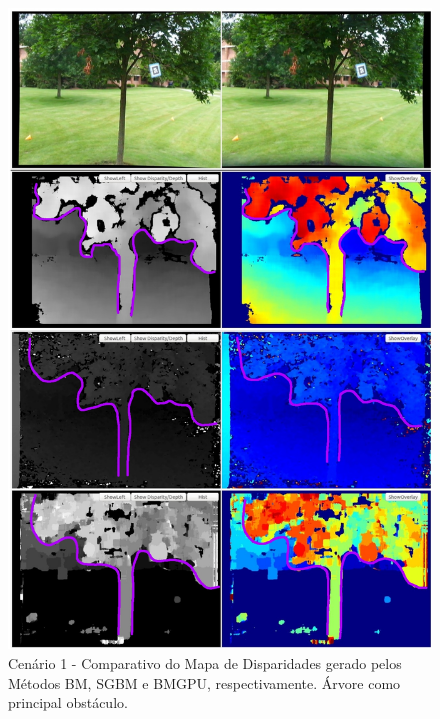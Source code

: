 \begin{figure}[H]
 	\centering
 	\includegraphics[scale=0.35]{./Resources/results/scene1_montage_highlighted.jpg}
 	\caption{Cenário 1 - Comparativo do Mapa de Disparidades gerado pelos Métodos BM, SGBM e BMGPU, respectivamente. Árvore como principal obstáculo.}
 	\label{scene1_montage}
\end{figure}

